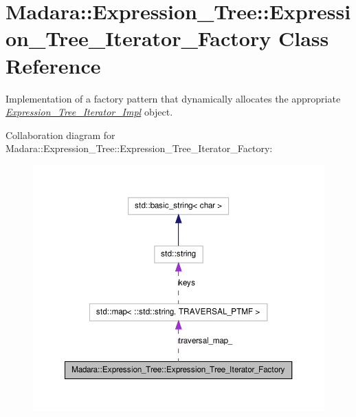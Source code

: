 \hypertarget{classMadara_1_1Expression__Tree_1_1Expression__Tree__Iterator__Factory}{
\section{Madara::Expression\_\-Tree::Expression\_\-Tree\_\-Iterator\_\-Factory Class Reference}
\label{d4/d93/classMadara_1_1Expression__Tree_1_1Expression__Tree__Iterator__Factory}
}


Implementation of a factory pattern that dynamically allocates the appropriate {\itshape \hyperlink{classMadara_1_1Expression__Tree_1_1Expression__Tree__Iterator__Impl}{Expression\_\-Tree\_\-Iterator\_\-Impl}\/} object.  




Collaboration diagram for Madara::Expression\_\-Tree::Expression\_\-Tree\_\-Iterator\_\-Factory:
\nopagebreak
\begin{figure}[H]
\begin{center}
\leavevmode
\includegraphics[width=362pt]{df/d36/classMadara_1_1Expression__Tree_1_1Expression__Tree__Iterator__Factory__coll__graph}
\end{center}
\end{figure}
